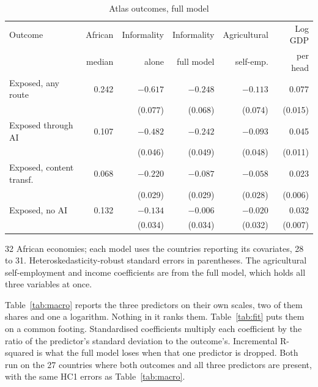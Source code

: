 \begin{table}[ht]
\centering
\caption{Atlas outcomes, full model}
\label{tab:atlas}
\small
\begin{tabular}{lrrrrr}
\toprule
Outcome & African & Informality & Informality & Agricultural & Log GDP \\
        & median  & alone       & full model  & self-emp.    & per head \\
\midrule
Exposed, any route            & 0.242 & $-0.617$ & $-0.248$ & $-0.113$ & 0.077 \\
                              &       & (0.077)  & (0.068)  & (0.074)  & (0.015) \\
Exposed through AI            & 0.107 & $-0.482$ & $-0.242$ & $-0.093$ & 0.045 \\
                              &       & (0.046)  & (0.049)  & (0.048)  & (0.011) \\
Exposed, content transf.      & 0.068 & $-0.220$ & $-0.087$ & $-0.058$ & 0.023 \\
                              &       & (0.029)  & (0.029)  & (0.028)  & (0.006) \\
Exposed, no AI                & 0.132 & $-0.134$ & $-0.006$ & $-0.020$ & 0.032 \\
                              &       & (0.034)  & (0.034)  & (0.032)  & (0.007) \\
\bottomrule
\end{tabular}

\vspace{4pt}
\begin{minipage}{0.94\linewidth}
\footnotesize
32 African economies; each model uses the countries reporting its covariates, 28
to 31. Heteroskedasticity-robust standard errors in parentheses. The agricultural
self-employment and income coefficients are from the full model, which holds all
three variables at once.
\end{minipage}
\end{table}

Table~\ref{tab:macro} reports the three predictors on their own scales, two of
them shares and one a logarithm. Nothing in it ranks them.
Table~\ref{tab:fit} puts them on a common footing. Standardised coefficients
multiply each coefficient by the ratio of the predictor's standard deviation to
the outcome's. Incremental R-squared is what the full model loses when that one
predictor is dropped. Both run on the 27 countries where both outcomes and all
three predictors are present, with the same HC1 errors as
Table~\ref{tab:macro}.

